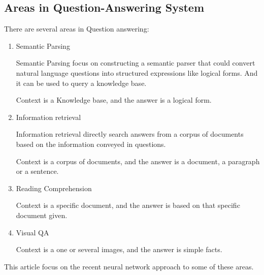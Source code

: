 \documentclass[12pt]{article}
\numberwithin{equation}{section}
\begin{document}
\subsection{Areas in  Question-Answering System}
	There are several areas in Question answering:
	\begin{enumerate}
	\item Semantic Parsing\par
		Semantic Parsing focus on constructing a semantic parser that could convert natural language questions into structured expressions like logical forms. And it can be used to query a knowledge base.\par
		Context is a Knowledge base, and the answer is a logical form. \par
	\item Information retrieval \par
		Information retrieval directly search answers from a corpus of documents based on the information conveyed in questions. \par
		Context is a corpus of documents, and the answer is a document, a paragraph or a sentence.
	\item Reading Comprehension\par
		Context is a specific document, and the answer is based on that specific document given.
	\item Visual QA \par
		Context is a one or several images, and the answer is simple facts.
	\end{enumerate} \par
	This article focus on the recent neural network approach to some of these areas. \par
\end{document}
